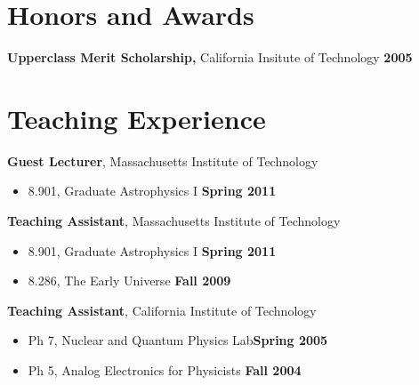 \documentclass[margin,line]{res}
\begin{document}
\begin{resume}
\section{\sc Honors and Awards} 
{\bf Upperclass Merit Scholarship,} California Insitute of Technology \hfill {\bf 2005}\\ 

\section{\sc Teaching Experience}
{\bf Guest Lecturer}, Massachusetts Institute of Technology
\vspace*{.05in}  
\begin{itemize}
\item[ ] 8.901, Graduate Astrophysics I \hfill {\bf Spring 2011}
\end{itemize}
{\bf Teaching Assistant}, Massachusetts Institute of Technology
\vspace*{.05in}
\begin{itemize}
\item[ ] 8.901, Graduate Astrophysics I \hfill {\bf Spring 2011}
\item[ ] 8.286, The Early Universe \hfill {\bf Fall 2009}
\end{itemize}
{\bf Teaching Assistant}, California Institute of Technology
\vspace*{.05in}
\begin{itemize}
\item[ ] Ph 7, Nuclear and Quantum Physics Lab\hfill {\bf Spring 2005}
\item[ ] Ph 5, Analog Electronics for Physicists \hfill {\bf Fall 2004}
\end{itemize}



\end{resume}
\end{document}
